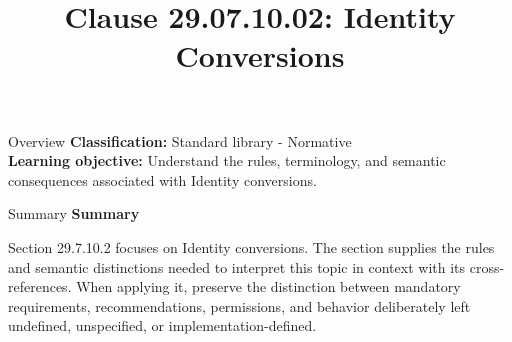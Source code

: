 \documentclass[10pt,letterpaper]{article}
\title{Clause 29.07.10.02: Identity Conversions}
\author{}
\date{}
\begin{document}
\maketitle
\begin{CornellOverviewBox}{Overview}
\textbf{Classification:} Standard library - Normative\\[2pt]
\textbf{Learning objective:} Understand the rules, terminology, and semantic consequences associated with Identity conversions.
\end{CornellOverviewBox}\begin{CornellSummaryBox}{Summary}
{\sffamily\bfseries\color{Accent} Summary}\par\vspace{3pt}Section 29.7.10.2 focuses on Identity conversions. The section supplies the rules and semantic distinctions needed to interpret this topic in context with its cross-references. When applying it, preserve the distinction between mandatory requirements, recommendations, permissions, and behavior deliberately left undefined, unspecified, or implementation-defined.
\end{CornellSummaryBox}
\end{document}
